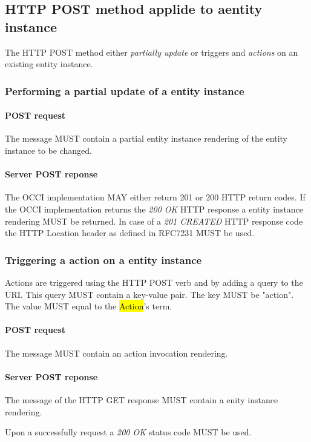 \documentclass[10pt,a4paper]{article}
\begin{document}
\subsection{HTTP POST method applide to aentity instance}
The HTTP POST method either {\em partially update} or triggers and {\em actions} on an existing entity instance.

\subsubsection{Performing a partial update of a entity instance}

\paragraph{POST request}
The message MUST contain a partial entity instance rendering of the entity instance to be changed.

\paragraph{Server POST reponse}
The OCCI implementation MAY either return 201 or 200 HTTP return codes. If the OCCI implementation
returns the \emph{200 OK} HTTP response a entity instance rendering MUST be returned.
In case of a \emph{201 CREATED} HTTP response code the HTTP Location header as defined in RFC7231 \cite{rfc7231} MUST be used.

\subsubsection{Triggering a action on a entity instance}
Actions are triggered using the HTTP POST verb and by adding a query to the URI. This query MUST contain a key-value pair. The key MUST be "action". The value MUST equal to the \hl{Action}'s term.

\paragraph{POST request}
The message MUST contain an action invocation rendering.

\paragraph{Server POST reponse}
The message of the HTTP GET response MUST contain a enity instance rendering.

Upon a successfully request a \emph{200 OK} status code MUST be used.
\end{document}
